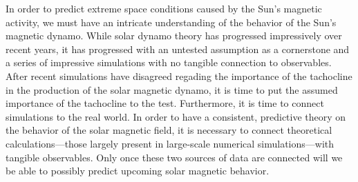 \documentclass[aasms,12pt]{article}
\begin{document}
In order to predict extreme space conditions caused by the Sun's magnetic
activity, we must have an intricate understanding of the behavior of the Sun's
magnetic dynamo.  While solar dynamo theory has progressed impressively over
recent years, it has progressed with an untested assumption as a cornerstone
and a series of impressive simulations with no tangible connection to
observables.  After recent simulations have disagreed regading the importance
of the tachocline in the production of the solar magnetic dynamo, it is time
to put the assumed importance of the tachocline to the test.  Furthermore,
it is time to connect simulations to the real world.  In order to have a
consistent, predictive theory on the behavior of the solar magnetic field, it
is necessary to connect theoretical calculations---those largely present in
large-scale numerical simulations---with tangible observables.  Only once these
two sources of data are connected will we be able to possibly predict upcoming
solar magnetic behavior.



\nocite{*}

\begingroup
\renewcommand{\section}[2]{}%
\begin{footnotesize}

\end{footnotesize}
\endgroup
\end{document}
